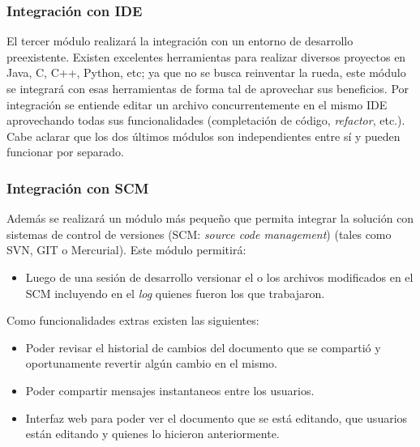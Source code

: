 \documentclass[a4paper,11pt]{article}
\begin{document}
				\subsubsection{Integraci\'on con IDE}
					El tercer m\'odulo realizar\'a la integraci\'on con un entorno de desarrollo
					preexistente. Existen excelentes herramientas para realizar diversos
					proyectos en Java, C, C++, Python, etc; ya que no se busca reinventar la rueda,
					este m\'odulo se integrar\'a con esas herramientas de forma tal de aprovechar sus
					beneficios. Por integraci\'on se entiende editar un archivo concurrentemente en
					el mismo IDE aprovechando todas sus funcionalidades (completaci\'on de c\'odigo,
					\textit{refactor}, etc.). \\

			Cabe aclarar que los dos \'ultimos m\'odulos son independientes entre s\'i y pueden
			funcionar por separado.

			\subsubsection{Integraci\'on con SCM}
				Adem\'as se realizar\'a un m\'odulo m\'as peque\~no que permita integrar la soluci\'on
				con sistemas de control de versiones (SCM: \textit{source code management}) (tales como
				SVN, GIT o Mercurial). Este m\'odulo permitir\'a:

				\begin{itemize}
					\item	Luego de una sesi\'on de desarrollo versionar el o los archivos modificados
							en el SCM incluyendo en el \textit{log} quienes fueron los que trabajaron.
				\end{itemize}

				Como funcionalidades extras existen las siguientes:

				\begin{itemize}
					\item	Poder revisar el historial de cambios del documento que se comparti\'o y
							oportunamente revertir alg\'un cambio en el mismo.
					\item 	Poder compartir mensajes instantaneos entre los usuarios.
					\item 	Interfaz web para poder ver el documento que se est\'a editando, que
							usuarios est\'an editando y quienes lo hicieron anteriormente.
				\end{itemize}
\end{document}

